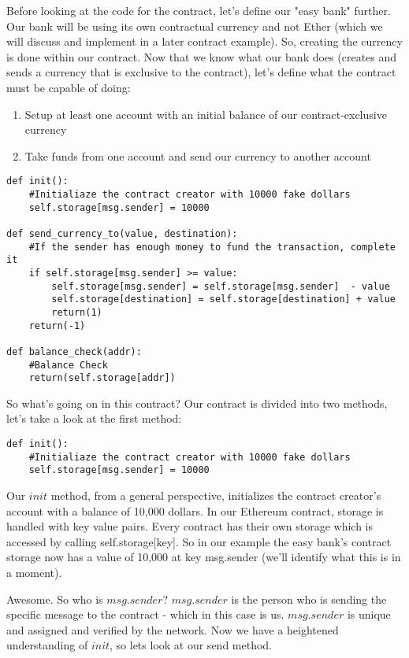 \documentclass[12pt]{article}
\begin{document}
Before looking at the code for the contract, let's define our "easy bank" further. Our bank will be using its own contractual currency and not Ether (which we will discuss and implement in a later contract example). So, creating the currency is done within our contract. Now that we know what our bank does (creates and sends a currency that is exclusive to the contract), let's define what the contract must be capable of doing:
\begin{enumerate}
\item Setup at least one account with an initial balance of our contract-exclusive currency
\item Take funds from one account and send our currency to another account
\end{enumerate}


\begin{mdframed}
\begin{verbatim}
def init():
	#Initialiaze the contract creator with 10000 fake dollars
	self.storage[msg.sender] = 10000

def send_currency_to(value, destination):
	#If the sender has enough money to fund the transaction, complete it
	if self.storage[msg.sender] >= value:
		self.storage[msg.sender] = self.storage[msg.sender]  - value
		self.storage[destination] = self.storage[destination] + value
		return(1)
	return(-1)

def balance_check(addr):
	#Balance Check
	return(self.storage[addr])
\end{verbatim}
\end{mdframed}
		
		
So what's going on in this contract?
Our contract is divided into two methods, let's take a look at the first method:

\begin{verbatim}
def init():
	#Initialiaze the contract creator with 10000 fake dollars
	self.storage[msg.sender] = 10000
\end{verbatim}
 
Our $init$ method, from a general perspective, initializes the contract creator's account with a balance of 10,000 dollars. In our Ethereum contract, storage is handled with key value pairs. Every contract has their own storage which is accessed by calling self.storage[key]. So in our example the easy bank's contract storage now has a value of 10,000 at key msg.sender (we'll identify what this is in a moment).

 Awesome. So who is $msg.sender$? $msg.sender$ is the person who is sending the specific message to the contract - which in this case is us. $msg.sender$ is unique and assigned and verified by the network. Now we have a heightened understanding of $init$, so lets look at our send method.
\end{document}

